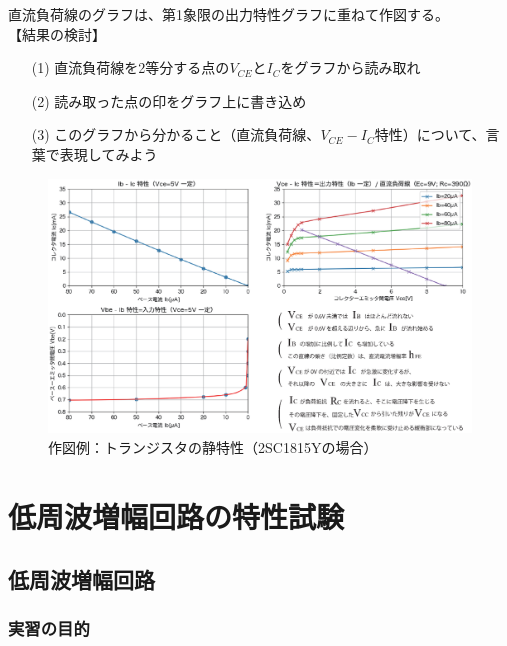 \documentclass[uplatex,a4paper,11pt,oneside,openany]{jsbook}
\begin{document}

直流負荷線のグラフは、第1象限の出力特性グラフに重ねて作図する。\\


【結果の検討】

\begin{enumerate}
\item[(1)] 直流負荷線を2等分する点の$V_{CE}$と$I_C$をグラフから読み取れ\\
\item[(2)] 読み取った点の印をグラフ上に書き込め\\
\item[(3)] このグラフから分かること（直流負荷線、$V_{CE}-I_C$特性）について、言葉で表現してみよう
\end{enumerate}

\newpage

\begin{figure}[H]
  \centering
   \includegraphics[keepaspectratio, scale=0.7, angle=90]
               {figs/eps/statictate.eps}
               \caption{作図例：トランジスタの静特性（2SC1815Yの場合）}
               \label{fig:staticexample}
\end{figure}

\part{低周波増幅回路の特性試験}

\chapter{低周波増幅回路}

\section{実習の目的}
\end{document}
